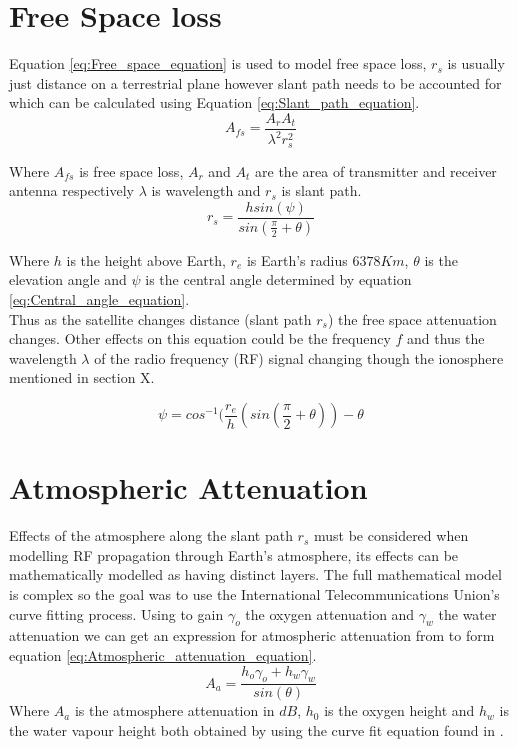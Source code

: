 \documentclass[conference]{IEEEtran}
\begin{document}
\section{Free Space loss}
Equation \ref{eq:Free_space_equation} is used to model free space loss, $r_s$ is usually just distance on a terrestrial plane however slant path needs to be accounted for which can be calculated using Equation \ref{eq:Slant_path_equation}.\\
\begin{equation}
A_{fs} = \frac{A_r A_t}{\lambda^2 r_s^2}
\label{eq:Free_space_equation}
\end{equation}

Where $A_{fs}$ is free space loss, $A_r$ and $A_t$ are the area of transmitter and receiver antenna respectively $\lambda$ is wavelength and $r_s$ is slant path.\\


\begin{equation}
r_s = \frac{h sin(\psi)}{sin(\frac{\pi}{2}+\theta)}
\label{eq:Slant_path_equation}
\end{equation}

Where $h$ is the height above Earth, $r_e$ is Earth's radius $6378K m$, $\theta$ is the elevation angle and $\psi$ is the central angle determined by equation \ref{eq:Central_angle_equation}.\\

Thus as the satellite changes distance (slant path $r_s$) the free space attenuation changes. Other effects on this equation could be the frequency $f$ and thus the wavelength $\lambda$ of the radio frequency (RF) signal changing though the ionosphere mentioned in section X. 

\begin{equation}
\psi = cos^{-1}(\frac{r_e}{h}(sin(\frac{\pi}{2}+\theta))-\theta
\label{eq:Central_angle_equation}
\end{equation}

\label{sec:2}

\section{Atmospheric Attenuation}
Effects of the atmosphere along the slant path $r_s$ must be considered when modelling RF propagation through Earth's atmosphere, its effects can be mathematically modelled as having distinct layers. The full mathematical model is complex so the goal was to use the International Telecommunications Union's curve fitting process. Using \cite{ITU-R_P.676-5} to gain $\gamma_{o}$ the oxygen attenuation and $\gamma_w$ the water attenuation we can get an expression for atmospheric attenuation from \cite{ITU-R_P.618-7} to form equation \ref{eq:Atmospheric_attenuation_equation}.
\begin{equation}
A_a = \frac{h_o \gamma_o + h_w \gamma_w}{sin(\theta)}
\label{eq:Atmospheric_attenuation_equation}
\end{equation}
Where $A_a$ is the atmosphere attenuation in $dB$, $h_0$ is the oxygen height and $h_w$ is the water vapour height both obtained by using the curve fit equation found in \cite{ITU-R_P.618-7}.
\end{document}
